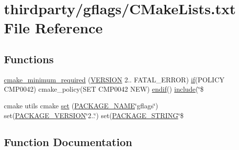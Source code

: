 \hypertarget{thirdparty_2gflags_2CMakeLists_8txt}{}\section{thirdparty/gflags/\+C\+Make\+Lists.txt File Reference}
\label{thirdparty_2gflags_2CMakeLists_8txt}
\subsection*{Functions}
\begin{DoxyCompactItemize}
\item 
\hyperlink{thirdparty_2gflags_2CMakeLists_8txt_ac7596ae6d0c282f1f5e46ac68d09e327}{cmake\+\_\+minimum\+\_\+required} (\hyperlink{config_8h_a1c6d5de492ac61ad29aec7aa9a436bbf}{V\+E\+R\+S\+I\+ON} 2.. F\+A\+T\+A\+L\+\_\+\+E\+R\+R\+OR) \hyperlink{thirdparty_2gflags_2test_2CMakeLists_8txt_a102cdd39d1229ea99555942b43b6a137}{if}(P\+O\+L\+I\+CY C\+M\+P0042) cmake\+\_\+policy(S\+ET C\+M\+P0042 N\+EW) \hyperlink{thirdparty_2gflags_2test_2CMakeLists_8txt_ac0f4e661f1b3de8d0e7e1b548fd08916}{endif}() \hyperlink{CMakeCache_8txt_a986ccfc90e04633694fe6cff5472be19}{include}(\char`\"{}\$
\item 
cmake utils cmake \hyperlink{thirdparty_2gflags_2CMakeLists_8txt_a3c1e89b6f001c0000360fccacf8586f9}{set} (\hyperlink{config_8h_a1c0439e4355794c09b64274849eb0279}{P\+A\+C\+K\+A\+G\+E\+\_\+\+N\+A\+ME}\char`\"{}gflags\char`\"{}) set(\hyperlink{config_8h_aa326a05d5e30f9e9a4bb0b4469d5d0c0}{P\+A\+C\+K\+A\+G\+E\+\_\+\+V\+E\+R\+S\+I\+ON}\char`\"{}2..\char`\"{}) set(\hyperlink{config_8h_ac73e6f903c16eca7710f92e36e1c6fbf}{P\+A\+C\+K\+A\+G\+E\+\_\+\+S\+T\+R\+I\+NG}\char`\"{}\$
\end{DoxyCompactItemize}


\subsection{Function Documentation}
